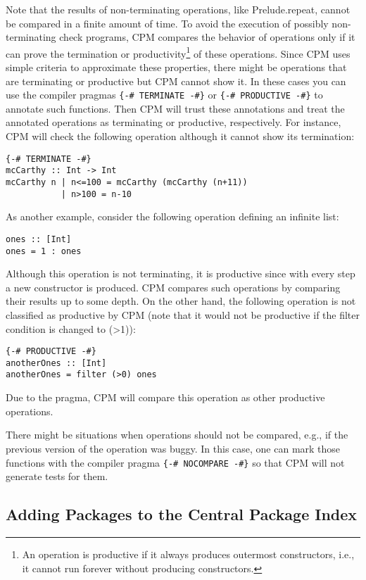 \documentclass[11pt]{article}
\renewcommand{\tt}{\usefont{OT1}{cmtt}{m}{n}\selectfont}
\newcommand{\codefont}{\small\tt}
\newcommand{\code}[1]{\mbox{\codefont #1}}
\begin{document}
Note that the results of non-terminating operations, like \code{Prelude.repeat},
cannot be compared in a finite amount of time.
To avoid the execution of possibly non-terminating check programs,
CPM compares the behavior of operations
only if it can prove the termination or productivity\footnote{%
An operation is productive if it always produces outermost constructors,
i.e., it cannot run forever without producing constructors.}
of these operations.
Since CPM uses simple criteria to approximate these properties,
there might be operations that are terminating or productive
but CPM cannot show it. In these cases you can use the compiler pragmas
\verb|{-# TERMINATE -#}| or \verb|{-# PRODUCTIVE -#}| to annotate such
functions. Then CPM will trust these annotations and treat
the annotated operations as terminating or productive, respectively.
For instance, CPM will check the following operation although
it cannot show its termination:

\begin{lstlisting}
{-# TERMINATE -#}
mcCarthy :: Int -> Int
mcCarthy n | n<=100 = mcCarthy (mcCarthy (n+11))
           | n>100 = n-10
\end{lstlisting}
%
As another example, consider the following operation defining
an infinite list:

\begin{lstlisting}
ones :: [Int]
ones = 1 : ones
\end{lstlisting}
%
Although this operation is not terminating, it is productive
since with every step a new constructor is produced.
CPM compares such operations by comparing their results up to
some depth.
On the other hand, the following operation is not classified
as productive by CPM (note that it would not be productive if the
filter condition is changed to \code{(>1)}):

\begin{lstlisting}
{-# PRODUCTIVE -#}
anotherOnes :: [Int]
anotherOnes = filter (>0) ones
\end{lstlisting}
%
Due to the pragma, CPM will compare this operation as other productive
operations.

There might be situations when operations should not be compared,
e.g., if the previous version of the operation was buggy.
In this case, one can mark those functions with the compiler pragma
\verb|{-# NOCOMPARE -#}| 
so that CPM will not generate tests for them.


\subsection{Adding Packages to the Central Package Index}
\label{sec:adding-a-package}
\end{document}
